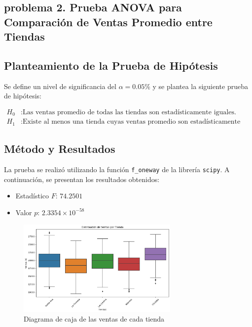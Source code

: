 \subsection{problema 2. Prueba ANOVA para Comparación de Ventas Promedio entre Tiendas}


\subsection*{Planteamiento de la Prueba de Hip\'otesis}

Se define un nivel de significancia del $\alpha = 0.05\%$ y se plantea la siguiente prueba de hip\'otesis:

\begin{align*}
H_0 &: \text{Las ventas promedio de todas las tiendas son estad\'isticamente iguales.} \\
H_1 &: \text{Existe al menos una tienda cuyas ventas promedio son estad\'isticamente diferentes.}
\end{align*}

\subsection*{Método y Resultados}

La prueba se realiz\'o utilizando la funci\'on \texttt{f\_oneway} de la librer\'ia \texttt{scipy}. A continuaci\'on, se presentan los resultados obtenidos:

\begin{itemize}
    \item Estad\'istico $F$: $74.2501$
    \item Valor $p$: $2.3354 \times 10^{-58}$
\end{itemize}

\begin{figure}[h!]
    \centering
    \includegraphics[width=0.7\textwidth]{distribucion_ventas_por_tiendas.png}
    \caption{Diagrama de caja de las ventas de cada tienda}
    \label{fig:ejemplo}
\end{figure}



